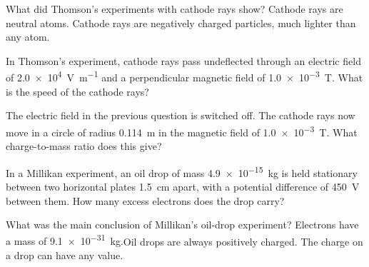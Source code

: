 
\begin{quizq}{}
What did Thomson's experiments with cathode rays show?
  {Cathode rays are neutral atoms.}
  {Cathode rays are negatively charged particles, much lighter than any atom.}
\end{quizq}

\begin{quizq}{}
In Thomson's experiment, cathode rays pass undeflected through an electric field of
\qty{2.0e4}{V.m^{-1}} and a perpendicular magnetic field of \qty{1.0e-3}{T}. What is the speed of the
cathode rays?
\end{quizq}

\begin{quizq}{}
The electric field in the previous question is switched off. The cathode rays now move in a circle of
radius \qty{0.114}{m} in the magnetic field of \qty{1.0e-3}{T}. What charge-to-mass ratio does this give?
\end{quizq}

\begin{quizq}{}
In a Millikan experiment, an oil drop of mass \qty{4.9e-15}{kg} is held stationary between two horizontal
plates \qty{1.5}{cm} apart, with a potential difference of \qty{450}{V} between them. How many excess
electrons does the drop carry?
\end{quizq}

\begin{quizq}{}
What was the main conclusion of Millikan's oil-drop experiment?
  {Electrons have a mass of \qty{9.1e-31}{kg}.}{Oil drops are always positively charged.}
  {The charge on a drop can have any value.}
\end{quizq}

